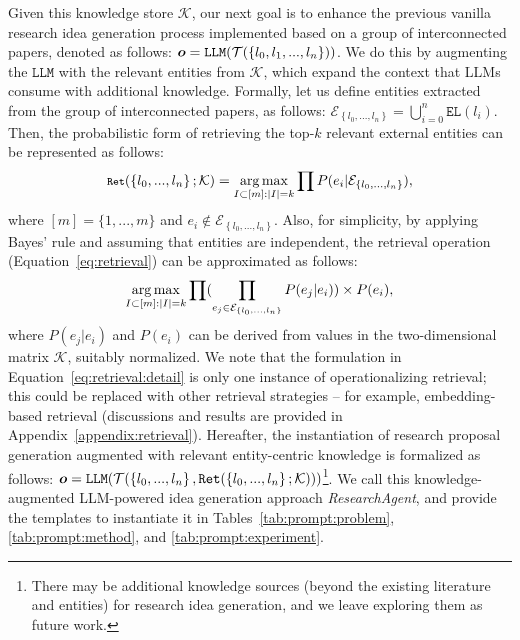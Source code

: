 Given this knowledge store $\mathcal{K}$, our next goal is to enhance the previous vanilla research idea generation process implemented based on a group of interconnected papers, denoted as follows: ${\bm{o}} = \texttt{LLM}(\mathcal{T}(\left\{ l_0, l_1, ..., l_n \right\}))$. We do this by augmenting the $\texttt{LLM}$ with the relevant entities from $\mathcal{K}$, which expand the context that LLMs consume with additional knowledge. Formally, let us define entities extracted from the group of interconnected papers, as follows: $\mathcal{E}_{\left\{ l_0, ..., l_n \right\}} = \bigcup_{i=0}^{n} \texttt{EL}(l_i)$. Then, the probabilistic form of retrieving the top-$k$ relevant external entities can be represented as follows: 
\begin{equation}
\fontsize{8pt}{8pt}\selectfont
    \texttt{Ret}(\left\{ l_0, ..., l_n \right\}; \mathcal{K}) = \argmax_{I \subset [m]: |I| = k } \prod {P(e_i | \mathcal{E}_{\left\{ l_0, ..., l_n \right\}})},
    \label{eq:retrieval}
\fontsize{8pt}{8pt}\selectfont
\end{equation}
where $ [m] = \{1, ..., m\} $ and $e_i \notin \mathcal{E}_{\left\{ l_0, ..., l_n \right\}}$. Also, for simplicity, by applying Bayes' rule and assuming that entities are independent, the retrieval operation (Equation~\ref{eq:retrieval}) can be approximated as follows:
\begin{equation}
\fontsize{8.5pt}{8.5pt}\selectfont
    \argmax_{I \subset [m]: |I| = k } \prod ({\prod_{e_j \in \mathcal{E}_{\left\{ l_0, ..., l_n \right\}}} P(e_j | e_i)}) \times P(e_i),
    \label{eq:retrieval:detail}
\fontsize{8.5pt}{8.5pt}\selectfont
\end{equation}
where $P(e_j | e_i)$ and $P(e_i)$ can be derived from values in the two-dimensional matrix $\mathcal{K}$, suitably normalized. We note that the formulation in Equation~\ref{eq:retrieval:detail} is only one instance of operationalizing retrieval; this could be replaced with other retrieval strategies -- for example, embedding-based retrieval (discussions and results are provided in Appendix~\ref{appendix:retrieval}). Hereafter, the instantiation of research proposal generation augmented with relevant entity-centric knowledge is formalized as follows: ${\bm{o}} = \texttt{LLM} (\mathcal{T}(\left\{ l_0, ..., l_n \right\}, \texttt{Ret}(\left\{ l_0, ..., l_n \right\}; \mathcal{K})))$\footnote{There may be additional knowledge sources (beyond the existing literature and entities) for research idea generation, and we leave exploring them as future work.}. We call this knowledge-augmented LLM-powered idea generation approach \emph{ResearchAgent}, and provide the templates to instantiate it in Tables~\ref{tab:prompt:problem}, \ref{tab:prompt:method}, and \ref{tab:prompt:experiment}.

